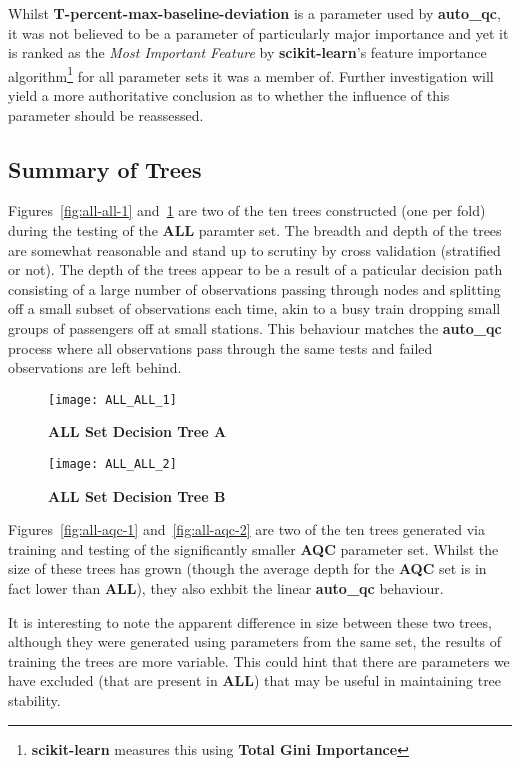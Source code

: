 Whilst \textbf{T-percent-max-baseline-deviation} is a parameter used by
\textbf{auto\_qc}, it was not believed to be a parameter of
particularly major importance and yet it is ranked as the \textit{Most
Important Feature} by \textbf{scikit-learn}'s feature importance
algorithm\footnote{\textbf{scikit-learn} measures this using \textbf{Total Gini
Importance}\citep{gini}}
for all parameter sets it was a member of. Further investigation will yield a
more authoritative conclusion as to whether the influence of this parameter
should be reassessed.


\subsection{Summary of Trees}

Figures~\ref{fig:all-all-1} and~\ref{fig:all-all-2} are two of the ten trees
constructed (one per fold) during the testing of the \textbf{ALL} paramter set.
The breadth and depth of the trees are somewhat reasonable and stand up to
scrutiny by cross validation (stratified or not). The depth of the trees appear
to be a result of a paticular decision path consisting of a large number of
observations passing through nodes and splitting off a small subset of
observations each time, akin to a busy train dropping small groups of
passengers off at small stations. This behaviour matches the \textbf{auto\_qc}
process where all observations pass through the same tests and failed
observations are left behind.



\begin{figure}[htbp!]
    \centering
    \texttt{[image: ALL\_ALL\_1]}
    \caption[all-all-1]{\textbf{ALL Set Decision Tree A}}
    \label{fig:all-all-1}

    \vspace{20mm}

    \texttt{[image: ALL\_ALL\_2]}
    \caption[all-all-2]{\textbf{ALL Set Decision Tree B}}
    \label{fig:all-all-2}
\end{figure}

Figures~\ref{fig:all-aqc-1} and~\ref{fig:all-aqc-2} are two of the ten trees
generated via training and testing of the significantly smaller \textbf{AQC}
parameter set. Whilst the size of these trees has grown (though the average
depth for the \textbf{AQC} set is in fact lower than \textbf{ALL}), they also
exhbit the linear \textbf{auto\_qc} behaviour.

It is interesting to note the apparent difference in size between these two
trees, although they were generated using parameters from the same set, the
results of training the trees are more variable. This could hint that there are
parameters we have excluded (that are present in \textbf{ALL}) that may
be useful in maintaining tree stability.

